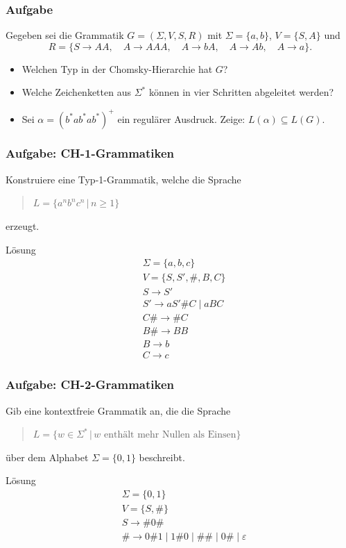 \begin{frame}
\frametitle{Aufgabe}
Gegeben sei die Grammatik $G = (\Sigma, V, S, R)$ mit $\Sigma = \{a, b\}$,
$V = \{S, A\}$ und 
\[ R = \{S \rightarrow AA, \quad A \rightarrow AAA,
\quad A \rightarrow bA, \quad A \rightarrow Ab, \quad A \rightarrow a\}. \]

\begin{itemize}
  \item Welchen Typ in der Chomsky-Hierarchie hat $G$?

  \item Welche Zeichenketten aus $\Sigma^*$ k\"onnen in vier Schritten abgeleitet werden?

  \item Sei $\alpha = (b^*ab^*ab^*)^+$ ein regul\"arer Ausdruck.
        Zeige: $L(\alpha) \subseteq L(G)$.
\end{itemize}
\end{frame}


\begin{frame}
\frametitle{Aufgabe: CH-1-Grammatiken}
Konstruiere eine Typ-1-Grammatik, welche die Sprache

\begin{quote}
  $L = \{a^n b^n c^n \, | \, n \geq 1\}$
\end{quote}

erzeugt.

\invincible
\pause
\begin{block}{Lösung}
\ducttape{-1cm}
\begin{align*}
&\Sigma = \{a, b, c\} \\
&V = \{ S, S', \#, B, C \} \\
&S \rightarrow S' \\
&S' \rightarrow aS'\#C \mid aBC \\
&C\# \rightarrow \#C \\
&B\# \rightarrow BB \\
&B \rightarrow b \\
&C \rightarrow c
\end{align*}
\end{block}
\vincible
\end{frame}

\begin{frame}
\frametitle{Aufgabe: CH-2-Grammatiken}
Gib eine kontextfreie Grammatik an, die die Sprache
\begin{quote}
  $L = \{w \in \Sigma^* \, | \, w \text{ enth\"alt mehr Nullen als Einsen}\}$  
\end{quote}
\"uber dem Alphabet $\Sigma = \{0, 1\}$ beschreibt.

\invincible
\pause
\begin{block}{Lösung}
\begin{align*}
&\Sigma = \{ 0, 1 \} \\
&V = \{ S, \# \} \\
&S \rightarrow \#0\# \\
&\# \rightarrow 0\#1 \mid 1\#0 \mid \#\# \mid 0\# \mid \varepsilon
\end{align*}
\end{block}
\vincible
\end{frame}


